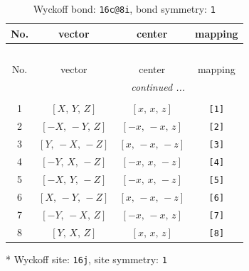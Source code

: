 \documentclass[fleqn,8pt]{jsarticle}
\begin{document}
\renewcommand{\arraystretch}{1.2}
\begin{longtable}{cccc}
\caption{Wyckoff bond: {\tt 16c@8i}, bond symmetry: {\tt 1}}
 \\
 \hline \hline
No. & vector & center & mapping \\ \hline \endfirsthead

\multicolumn{3}{l}{\tablename\ \thetable{}} \\
 \hline \hline
No. & vector & center & mapping \\ \hline \endhead

 \hline \hline
\multicolumn{3}{r}{\footnotesize\it continued ...} \\ \endfoot

 \hline \hline
\multicolumn{3}{r}{} \\ \endlastfoot

1 & $\left[ X,\, Y,\, Z \right]$ & $\left[ x,\, x,\, z \right]$ & {\tt [1]} \\ \hline
2 & $\left[ - X,\, - Y,\, Z \right]$ & $\left[ - x,\, - x,\, z \right]$ & {\tt [2]} \\ \hline
3 & $\left[ Y,\, - X,\, - Z \right]$ & $\left[ x,\, - x,\, - z \right]$ & {\tt [3]} \\ \hline
4 & $\left[ - Y,\, X,\, - Z \right]$ & $\left[ - x,\, x,\, - z \right]$ & {\tt [4]} \\ \hline
5 & $\left[ - X,\, Y,\, - Z \right]$ & $\left[ - x,\, x,\, - z \right]$ & {\tt [5]} \\ \hline
6 & $\left[ X,\, - Y,\, - Z \right]$ & $\left[ x,\, - x,\, - z \right]$ & {\tt [6]} \\ \hline
7 & $\left[ - Y,\, - X,\, Z \right]$ & $\left[ - x,\, - x,\, z \right]$ & {\tt [7]} \\ \hline
8 & $\left[ Y,\, X,\, Z \right]$ & $\left[ x,\, x,\, z \right]$ & {\tt [8]} \\
\end{longtable}
* Wyckoff site: {\tt 16j}, site symmetry: {\tt 1}
\renewcommand{\arraystretch}{1.2}
\end{document}
